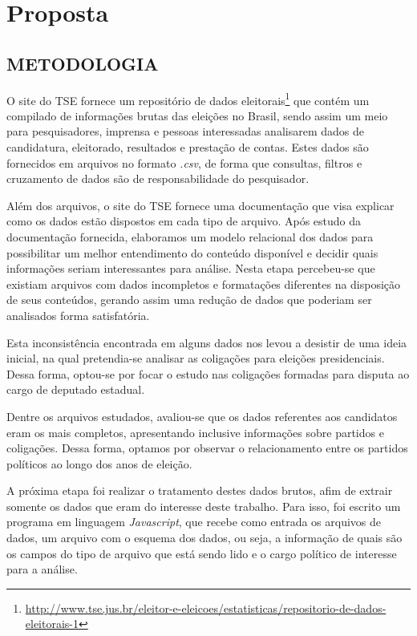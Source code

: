 \chapter{Proposta}
\label{proposta}

\section{\texorpdfstring{\MakeUppercase{Metodologia}}{}}
\label{proposta__metodologia}

O site do \gls{TSE} fornece um repositório de dados eleitorais\footnote{\url{http://www.tse.jus.br/eleitor-e-eleicoes/estatisticas/repositorio-de-dados-eleitorais-1}} que contém um compilado de informações brutas das eleições no Brasil, sendo assim um meio para pesquisadores, imprensa e pessoas interessadas analisarem dados de candidatura, eleitorado, resultados e prestação de contas. Estes dados são fornecidos em arquivos no formato \emph{.csv}, de forma que consultas, filtros e cruzamento de dados são de responsabilidade do pesquisador.

Além dos arquivos, o site do \gls{TSE} fornece uma documentação que visa explicar como os dados estão dispostos em cada tipo de arquivo. Após estudo da documentação fornecida, elaboramos um modelo relacional dos dados para possibilitar um melhor entendimento do conteúdo disponível e decidir quais informações seriam interessantes para análise. Nesta etapa percebeu-se que existiam arquivos com dados incompletos e formatações diferentes na disposição de seus conteúdos, gerando assim uma redução de dados que poderiam ser analisados forma satisfatória. 

Esta inconsistência encontrada em alguns dados nos levou a desistir de uma ideia inicial, na qual pretendia-se analisar as coligações para eleições presidenciais. Dessa forma, optou-se por focar o estudo nas coligações formadas para disputa ao cargo de deputado estadual. 

Dentre os arquivos estudados, avaliou-se que os dados referentes aos candidatos eram os mais completos, apresentando inclusive informações sobre partidos e coligações. Dessa forma, optamos por observar o relacionamento entre os partidos políticos ao longo dos anos de eleição. 

A próxima etapa foi realizar o tratamento destes dados brutos, afim de extrair somente os dados que eram do interesse deste trabalho. Para isso, foi escrito um programa em linguagem \emph{Javascript}, que recebe como entrada os arquivos de dados, um arquivo com o esquema dos dados, ou seja, a informação de quais são os campos do tipo de arquivo que está sendo lido e o cargo político de interesse para a análise.


